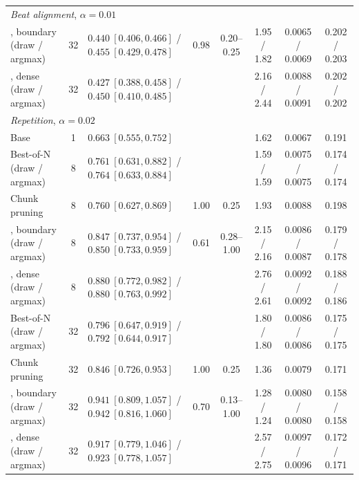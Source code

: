 \begin{table}[h]
\begin{center}
{\begin{tabular}{l c l c c ccc}
\multicolumn{8}{l}{\emph{Beat alignment}, $\alpha = 0.01$} \\
\method{}, boundary (draw / argmax) & 32 & $0.440\ [0.406, 0.466]$ / $0.455\ [0.429, 0.478]$ & 0.98 & 0.20--0.25 & 1.95 / 1.82 & 0.0065 / 0.0069 & 0.202 / 0.203 \\
\method{}, dense (draw / argmax) & 32 & $0.427\ [0.388, 0.458]$ / $0.450\ [0.410, 0.485]$ & & & 2.16 / 2.44 & 0.0088 / 0.0091 & 0.202 / 0.202 \\
\midrule
\multicolumn{8}{l}{\emph{Repetition}, $\alpha = 0.02$} \\
Base & 1 & $0.663\ [0.555, 0.752]$ & & & 1.62 & 0.0067 & 0.191 \\
Best-of-N (draw / argmax) & 8 & $0.761\ [0.631, 0.882]$ / $0.764\ [0.633, 0.884]$ & & & 1.59 / 1.59 & 0.0075 / 0.0075 & 0.174 / 0.174 \\
Chunk pruning & 8 & $0.760\ [0.627, 0.869]$ & 1.00 & 0.25 & 1.93 & 0.0088 & 0.198 \\
\method{}, boundary (draw / argmax) & 8 & $0.847\ [0.737, 0.954]$ / $0.850\ [0.733, 0.959]$ & 0.61 & 0.28--1.00 & 2.15 / 2.16 & 0.0086 / 0.0087 & 0.179 / 0.178 \\
\method{}, dense (draw / argmax) & 8 & $0.880\ [0.772, 0.982]$ / $0.880\ [0.763, 0.992]$ & & & 2.76 / 2.61 & 0.0092 / 0.0092 & 0.188 / 0.186 \\
Best-of-N (draw / argmax) & 32 & $0.796\ [0.647, 0.919]$ / $0.792\ [0.644, 0.917]$ & & & 1.80 / 1.80 & 0.0086 / 0.0086 & 0.175 / 0.175 \\
Chunk pruning & 32 & $0.846\ [0.726, 0.953]$ & 1.00 & 0.25 & 1.36 & 0.0079 & 0.171 \\
\method{}, boundary (draw / argmax) & 32 & $0.941\ [0.809, 1.057]$ / $0.942\ [0.816, 1.060]$ & 0.70 & 0.13--1.00 & 1.28 / 1.24 & 0.0080 / 0.0080 & 0.158 / 0.158 \\
\method{}, dense (draw / argmax) & 32 & $0.917\ [0.779, 1.046]$ / $0.923\ [0.778, 1.057]$ & & & 2.57 / 2.75 & 0.0097 / 0.0096 & 0.172 / 0.171 \\
\bottomrule
\end{tabular}}
\end{center}
\end{table}

